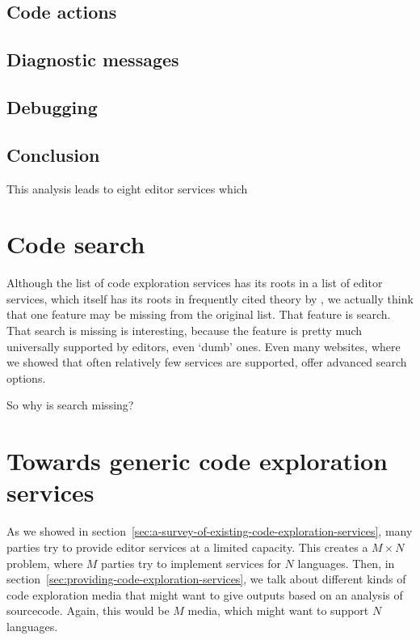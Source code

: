 \subsection*{Code actions}

\subsection*{Diagnostic messages}

\subsection*{Debugging}

\subsection{Conclusion}

This analysis leads to eight editor services which

\section{Code search}\label{subsec:code-search}

Although the list of code exploration services has its roots in a list of editor services, which itself has its roots in
frequently cited theory by \citeauthor{ErdwegSV13}, we actually think that one feature may be missing from the original list.
That feature is search.
That search is missing is interesting, because the feature is pretty much universally supported by editors, even `dumb' ones.
Even many websites, where we showed that often relatively few services are supported, offer advanced search options.

So why is search missing?

\section{Towards generic code exploration services}

As we showed in section~\ref{sec:a-survey-of-existing-code-exploration-services}, many parties try to provide editor services
at a limited capacity.
This creates a $M \times N$ problem, where $M$ parties try to implement services for $N$ languages.
Then, in section~\ref{sec:providing-code-exploration-services}, we talk about different kinds of code exploration media that might
want to give outputs based on an analysis of sourcecode.
Again, this would be $M$ media, which might want to support $N$ languages.

